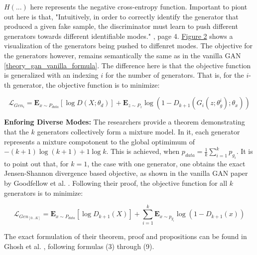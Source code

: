 \noindent
\(H(...)\) here represents the negative cross-entropy function. Important to piont out here is that, "Intuitively, in order to correctly identify the generator that produced a given fake sample, the discriminator must learn to push different generators towards different identifiable modes." \cite{ghosh2018madgan}, page 4. \hyperref[fig:figure_madgan_diverse_mode_push]{Figure 2} shows a visualization of the generators being pushed to diffenret modes. The objective for the generators however, remains semantically the same as in the vanilla GAN \ref{theory_gan_vanilla_formula}. The difference here is that the objective function is generalized with an indexing \(i\) for the number of generators. That is, for the \(i\)-th generator, the objective function is to minimize:

\begin{equation}
    \mathcal{L}_{Gen_i} = \mathbf{E}_{x \sim P_{data}} [ \log D(X; \theta_d) ] + \mathbf{E}_{z \sim P_{z}} \log (1-D_{k+1}(G_i(z; \theta_{g}^{i}); \theta_x))
\end{equation}

\textbf{Enforing Diverse Modes:}
The researchers provide a theorem demonstrating that the \(k\) generators collectively form a mixture model. In it, each generator represents a mixture compotonent to the global optimimum of \( -(k+1)\log(k+1)+1 \log k \). This is achieved, when \(p_{data} = \frac{1}{k}\sum_{i=1}^{k} p_{g_i}\). It is to point out that, for \(k = 1\), the case with one generator, one obtains the exact Jensen-Shannon divergence based objective, as shown in the vanilla GAN paper by Goodfellow et al. \cite{goodfellow2014generativeadversarialnetworks}. Following their proof, the objective function for all \(k\) generators is to minimize:

\begin{equation}
    \mathcal{L}_{Gen_{[0...K]}} = \mathbf{E}_{x \sim P_{data}} [ \log D_{k+1}(X) ] + \sum_{i=1}^{k}\mathbf{E}_{x \sim p_{g_i}} \log (1-D_{k+1}(x))
\end{equation}

\noindent
The exact formulation of their theorem, proof and propositions can be found in Ghosh et al. \cite{ghosh2018madgan}, following formulas (3) through (9).

